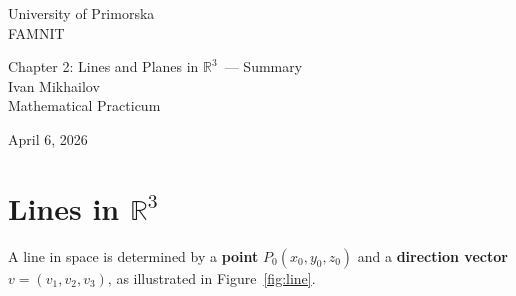 \documentclass[11pt]{article}
\title{}
\author{Ivan Mikhailov}
\theoremstyle{plain}
\theoremstyle{definition}
\newcommand{\R}{\mathbb{R}}
\newcommand{\hwdate}{April 6, 2026}
\newcommand{\rthree}{$\R^3$}
\begin{document}
\thispagestyle{empty}
\begin{flushleft}           
    University of Primorska \\
    FAMNIT
\end{flushleft}

\vspace*{0.2\textheight} 

\begin{center}
    {\LARGE Chapter 2: Lines and Planes in \rthree\  — Summary}\\[1cm]
    {\large Ivan Mikhailov}\\[0.25cm]
    {\large Mathematical Practicum \uppercase\expandafter{}}
\end{center}

\vfill


\begin{flushleft}
    \hwdate
\end{flushleft}

\newpage

\setcounter{page}{1}

\begin{abstract}
This summary presents the core concepts of lines and planes in \rthree.
Lines are described using a point and a direction vector, while planes are defined by a point and a normal vector, each with multiple equivalent representations.
It covers intersections, distances, and angles between lines, planes, and points, providing key formulas for practical computations.
The summary consolidates essential vector-based techniques for analyzing spatial relationships in three-dimensional space.
The material follows \cite{protter} and \cite{algebra1}.
\end{abstract}

\newpage

\tableofcontents
\vspace{1cm}
\listoftables
\vspace{1cm}
\listoffigures

\newpage

\section{Lines in \texorpdfstring{\rthree}{R\textasciicircum 3}}
A line in space is determined by a \textbf{point} $P_0(x_0, y_0, z_0)$
and a \textbf{direction vector} $v = (v_1, v_2, v_3)$, as illustrated in Figure~\ref{fig:line}.
\end{document}
